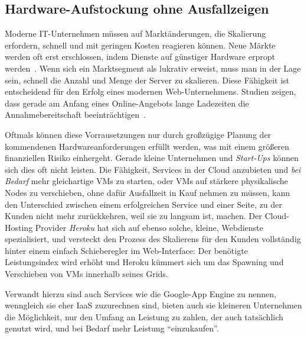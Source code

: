 \subsection{Hardware-Aufstockung ohne Ausfallzeigen}
Moderne IT-Unternehmen müssen auf Marktänderungen, die Skalierung
erfordern, schnell und mit geringen Kosten reagieren können. Neue
Märkte werden oft erst erschlossen, indem Dienste auf günstiger
Hardware erpropt werden~\cite{tanenbaum1992modern}. Wenn sich ein
Marktsegment als lukrativ erweist, muss man in der Lage sein, schnell
die Anzahl und Menge der Server zu skalieren. Diese Fähigkeit ist
entscheidend für den Erfolg eines modernen Web-Unternehmens. Studien
zeigen, dass gerade am Anfang eines Online-Angebots lange Ladezeiten
die Annahmebereitschaft beeinträchtigen~\cite{kohavi2007online}.

Oftmals können diese Vorrausetzungen nur durch großzügige Planung der
kommendenen Hardwareanforderungen erfüllt werden, was mit einem
größeren finanziellen Risiko einhergeht. Gerade kleine Unternehmen und
\emph{Start-Ups} können sich dies oft nicht leisten. Die Fähigkeit,
Services in der Cloud anzubieten und \emph{bei Bedarf} mehr
gleichartige VMs zu starten, oder VMs auf stärkere physikalische Nodes
zu verschieben, ohne dafür Ausfallzeit in Kauf nehmen zu müssen, kann
den Unterschied zwischen einem erfolgreichen Service und einer Seite,
zu der Kunden nicht mehr zurückkehren, weil sie zu langsam ist,
machen. Der Cloud-Hosting Provider \emph{Heroku} hat sich auf ebenso
solche, kleine, Webdienste spezialisiert, und versteckt den Prozess
des Skalierens für den Kunden vollständig hinter einem einfach
Schieberegler im Web-Interface: Der benötigte Leistungsindex wird
erhöht und Heroku kümmert sich um das Spawning und Verschieben von
VMs innerhalb seines Grids.

Verwandt hierzu sind auch Services wie die Google-App Engine zu
nennen, wenngleich sie eher \ac{IaaS} zuzurechnen sind, bieten auch
sie kleineren Unternehmen die Möglichkeit, nur den Umfang an Leistung
zu zahlen, der auch tatsächlich genutzt wird, und bei Bedarf mehr
Leistung "`einzukaufen"'.

